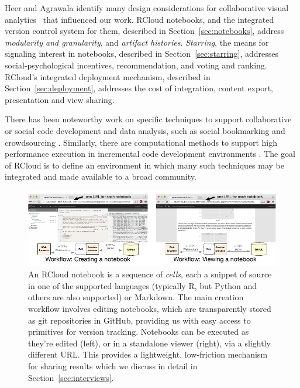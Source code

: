 Heer and Agrawala identify many design considerations for
collaborative visual analytics~\cite{Heer:2008:DCF} that
influenced our work.
RCloud notebooks, and the integrated version control system for them,
described in Section~\ref{sec:notebooks}, address {\it modularity and
granularity}, and {\it artifact histories}.
\emph{Starring}, the means for signaling interest in notebooks, described in
Section~\ref{sec:starring}, addresses social-psychological incentives,
recommendation, and voting and ranking. RCloud's integrated deployment
mechanism, described in Section~\ref{sec:deployment}, addresses the cost of
integration, content export, presentation and view sharing.


There has been noteworthy work on specific techniques
to support collaborative or social code development and data analysis,
such as social bookmarking \cite{Millen:2006:DSB} \cite{Heer:2007:VAV}
and crowdsourcing \cite{Fast:2014:ECS}.
Similarly, there are computational methods to support high
performance execution in incremental code development
environments \cite{Guo:2010:TPI}.
The goal of RCloud is to define an environment in which many such
techniques may be integrated and made available to a broad community.
\begin{figure}
\centering
\includegraphics[width=.95\linewidth]{fig/notebook/notebook.pdf}
\caption{\label{fig:notebook}An RCloud notebook is a sequence of
\emph{cells}, each a snippet of source in one of the supported languages (typically R, but Python and others are also supported) or Markdown. The main creation workflow involves editing notebooks, which are transparently stored as git repositories in GitHub, providing us with easy access to primitives for version tracking. Notebooks can be executed as they're edited (left), or in a standalone viewer (right), via a slightly different URL. This provides a lightweight, low-friction mechanism for sharing results which we discuss in detail in Section~\ref{sec:interviews}. }
\end{figure}

